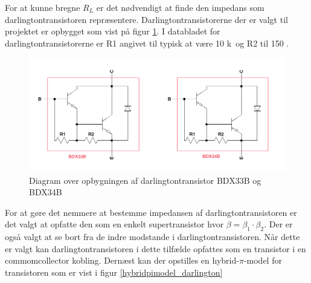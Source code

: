 For at kunne bregne $R_L$ er det nødvendigt at finde den impedans som darlingtontransistoren repræsentere. Darlingtontransistorerne der er valgt til projektet er opbygget som vist på figur \ref{darlington_diagram}. I databladet for darlingtontransistorerne   er R1 angivet til typisk at være 10 k\ohm~og R2 til 150 \ohm.

\begin{figure}[h]
\centering
\includegraphics[width=\textwidth]{teknisk/effektforstaerker/darlingtontransistor_opbygning.png}
\caption{Diagram over opbygningen af darlingtontransistor BDX33B og BDX34B}
\label{darlington_diagram}
\end{figure}

For at gøre det nemmere at bestemme impedansen af darlingtontransistoren er det valgt at opfatte den som en enkelt supertransistor hvor $\beta = \beta_1 \cdot \beta_2$. Der er også valgt at se bort fra de indre modstande i darlingtontransistoren. Når dette er valgt kan darlingtontransistoren i dette tilfælde opfattes som en transistor i en commomcollector kobling. Dernæst kan der opstilles en hybrid-$\pi$-model for transistoren som er vist i figur \ref{hybridpimodel_darlington} 

